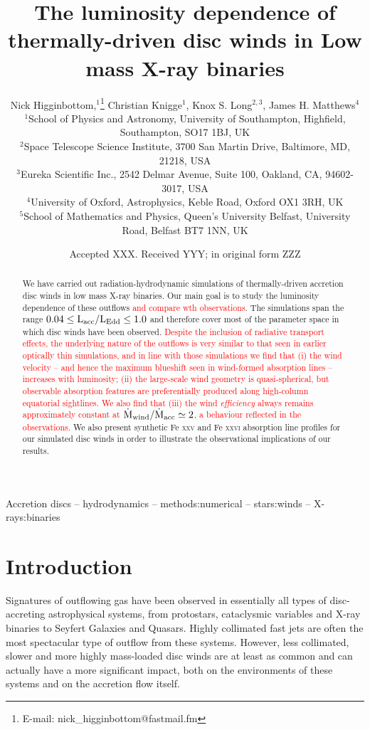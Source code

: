 \documentclass[a4paper,fleqn,usenatbib]{mnras}
\title[The luminosity dependence of disc winds in LMXBs]{The luminosity dependence of thermally-driven disc winds in Low mass X-ray binaries}
\author[N. Higginbottom et. al]
{Nick Higginbottom,$^{1}$\thanks{E-mail: nick\_higginbottom@fastmail.fm}
Christian Knigge$^{1}$, Knox S. Long$^{2,3}$, 
James H. Matthews$^{4}$ \newauthor{and
Edward J. Parkinson$^{1}$.}
\\
$^{1}$School of Physics and Astronomy, University of Southampton, Highfield, Southampton, SO17 1BJ, UK\\
$^{2}$Space Telescope Science Institute, 3700 San Martin Drive, Baltimore, MD, 21218, USA\\
$^{3}$Eureka Scientific Inc., 2542 Delmar Avenue, Suite 100, Oakland, CA, 94602-3017, USA\\
$^{4}$University of Oxford, Astrophysics, Keble Road, Oxford OX1 3RH, UK\\
$^{5}$School of Mathematics and Physics, Queen's University Belfast, University Road, Belfast 
BT7 1NN, UK\\
}
\date{Accepted XXX. Received YYY; in original form ZZZ}
\begin{document}
\label{firstpage}
\pagerange{\pageref{firstpage}--\pageref{lastpage}}
\maketitle

\begin{abstract}

  We have carried out radiation-hydrodynamic simulations of
  thermally-driven accretion disc winds in low mass X-ray binaries. Our main
  goal is to study the luminosity dependence of these outflows \textcolor{red}{
  and compare wth observations}. The 
  simulations span the range 
  $\rm{0.04 \leq L_{acc}/L_{Edd} \leq 1.0}$ and therefore cover most
  of the parameter space in which disc winds have been observed. \textcolor{red}{
  Despite the inclusion of radiative transport effects, the underlying nature of the 
  outflows is very similar to that seen in earlier optically thin simulations, and in
  line with those simulations  we find that 
  (i) the wind velocity -- and hence the maximum blueshift seen
  in wind-formed absorption lines -- increases with luminosity;
  (ii) the large-scale wind geometry is quasi-spherical, but 
  observable absorption features are preferentially produced along
  high-column equatorial sightlines. We
  also find that (iii) the wind {\em
  efficiency} always remains approximately
  constant at $\rm{\dot{M}_{wind}/\dot{M}_{acc} \simeq 2}$, a behaviour
  reflected in the observations.}
  We also present synthetic Fe \textsc{xxv}
  and Fe \textsc{xxvi} absorption line profiles for our simulated disc winds in order
  to illustrate the observational implications of our results.

\end{abstract}

\begin{keywords}
Accretion discs -- hydrodynamics -- methods:numerical -- stars:winds -- X-rays:binaries
\end{keywords}



\section{Introduction}
Signatures of outflowing gas have been observed in essentially all
types of disc-accreting astrophysical systems, from protostars,
cataclysmic variables and X-ray binaries to Seyfert Galaxies and
Quasars. Highly collimated fast jets are often the most spectacular
type of outflow from these systems. However, less collimated, slower
and more highly mass-loaded disc winds are at least as common and can 
actually have a more significant impact, both on the environments of
these systems and on the accretion flow itself. 
 
\end{document}
